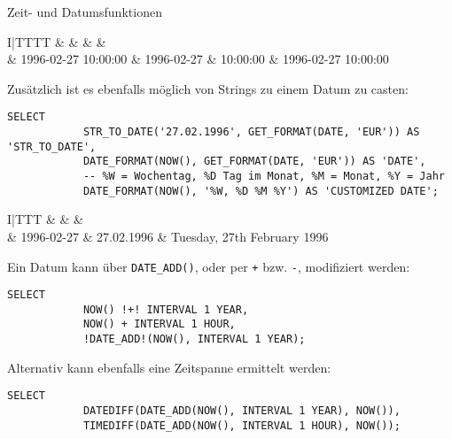 \begin{sql}{Zeit- und Datumsfunktionen}
    \setcounter{rownum}{0}
    \begin{tabular}{I|TTTT}
        &  &  &  &  \\ & 1996-02-27 10:00:00 & 1996-02-27 & 10:00:00 & 1996-02-27 10:00:00 \\
    \end{tabular}

    Zusätzlich ist es ebenfalls möglich von Strings zu einem Datum zu casten:

    \begin{lstlisting}[language=mysql]
        SELECT
            STR_TO_DATE('27.02.1996', GET_FORMAT(DATE, 'EUR')) AS 'STR_TO_DATE',
            DATE_FORMAT(NOW(), GET_FORMAT(DATE, 'EUR')) AS 'DATE',
            -- %W = Wochentag, %D Tag im Monat, %M = Monat, %Y = Jahr
            DATE_FORMAT(NOW(), '%W, %D %M %Y') AS 'CUSTOMIZED DATE';
    \end{lstlisting}

    \setcounter{rownum}{0}
    \begin{tabular}{I|TTT}
        &  &  &  \\ & 1996-02-27 & 27.02.1996 & Tuesday, 27th February 1996 \\
    \end{tabular}

    Ein Datum kann über \lstinline[language=mysql]{DATE_ADD()}, oder per \texttt{+} bzw. \texttt{-}, modifiziert werden:

    \begin{lstlisting}[language=mysql]
        SELECT
            NOW() !+! INTERVAL 1 YEAR,
            NOW() + INTERVAL 1 HOUR,
            !DATE_ADD!(NOW(), INTERVAL 1 YEAR);
    \end{lstlisting}

    Alternativ kann ebenfalls eine Zeitspanne ermittelt werden:

    \begin{lstlisting}[language=mysql]
        SELECT
            DATEDIFF(DATE_ADD(NOW(), INTERVAL 1 YEAR), NOW()),
            TIMEDIFF(DATE_ADD(NOW(), INTERVAL 1 HOUR), NOW());
    \end{lstlisting}
\end{sql}